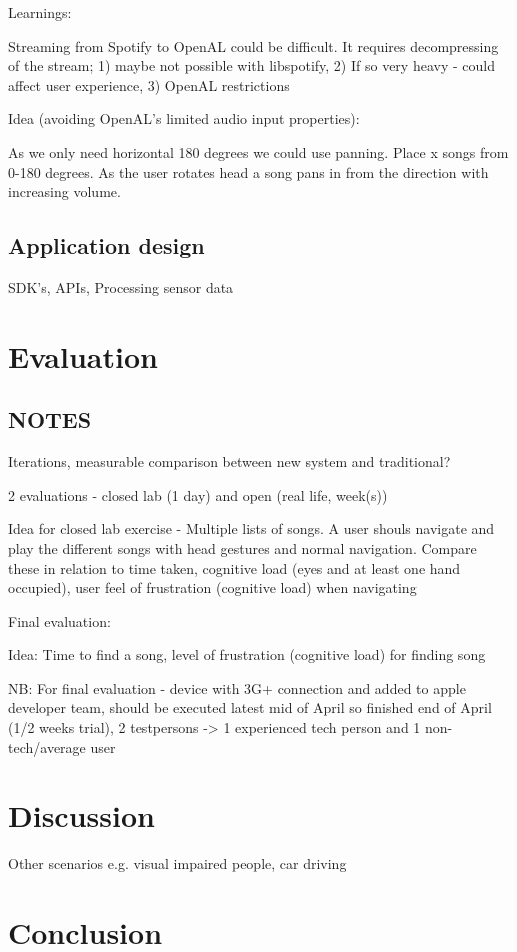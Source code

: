 \documentclass{article}
\begin{document}
Learnings:

Streaming from Spotify to OpenAL could be difficult. It requires decompressing of the stream; 1) maybe not possible with libspotify, 2) If so very heavy - could affect user experience, 3) OpenAL restrictions

Idea (avoiding OpenAL's limited audio input properties):

As we only need horizontal 180 degrees we could use panning. Place x songs from 0-180 degrees. As the user rotates head a song pans in from the direction with increasing volume.



\subsection{Application design}
SDK's, APIs, Processing sensor data

\section{Evaluation}

\subsection{NOTES}

Iterations, measurable comparison between new system and traditional?

2 evaluations - closed lab (1 day) and open (real life, week(s))

Idea for closed lab exercise - Multiple lists of songs. A user shouls navigate and play the different songs with head gestures and normal navigation. Compare these in relation to time taken, cognitive load (eyes and at least one hand occupied), user feel of frustration (cognitive load) when navigating

Final evaluation:

Idea: Time to find a song, level of frustration (cognitive load) for finding song

NB: For final evaluation - device with 3G+ connection and added to apple developer team, should be executed latest mid of April so finished end of April (1/2 weeks trial), 2 testpersons -> 1 experienced tech person and 1 non-tech/average user

\section{Discussion}
Other scenarios e.g. visual impaired people, car driving


\section{Conclusion}



\clearpage



\end{document}
